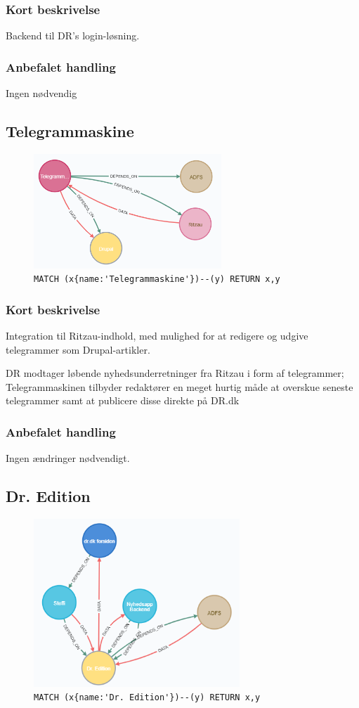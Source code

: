 \documentclass{article}
\begin{document}
\subsubsection*{Kort beskrivelse}
Backend til DR's login-løsning.
\subsubsection*{Anbefalet handling}
Ingen nødvendig


\subsection{Telegrammaskine}
\begin{figure}[H]
\includegraphics[width=200pt]{Telegrammaskine.PNG}
\cprotect\caption{\verb|MATCH (x{name:'Telegrammaskine'})--(y) RETURN x,y|}
\end{figure}
\subsubsection*{Kort beskrivelse}
Integration til Ritzau-indhold, med mulighed for at redigere og udgive telegrammer som Drupal-artikler.	

DR modtager løbende nyhedsunderretninger fra Ritzau i form af telegrammer; Telegrammaskinen tilbyder redaktører en meget hurtig måde at overskue seneste telegrammer samt at publicere disse direkte på DR.dk
\subsubsection*{Anbefalet handling}
Ingen ændringer nødvendigt.


\subsection{Dr. Edition}
\begin{figure}[H]
\includegraphics[width=220pt]{DrEdition.PNG}
\cprotect\caption{\verb|MATCH (x{name:'Dr. Edition'})--(y) RETURN x,y|}
\end{figure}
\end{document}
